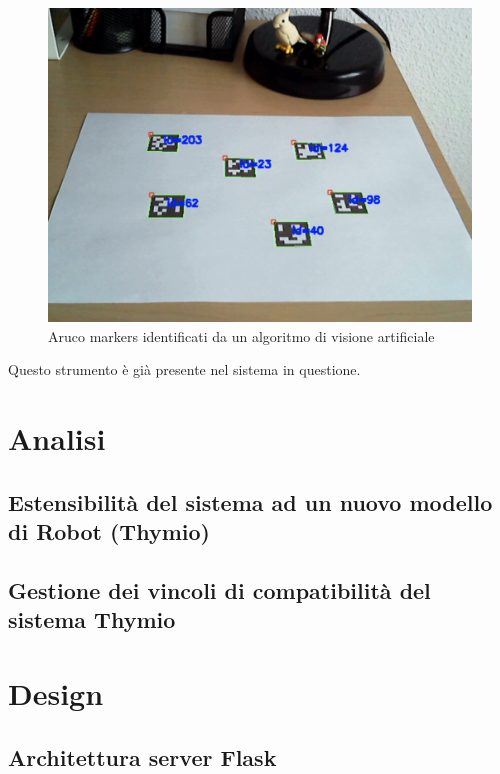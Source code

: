 \documentclass[12pt,a4paper,openright,twoside]{book}
\begin{document}
\begin{figure}
    \centering
    \includegraphics[width=.8\linewidth]{figures/aruco-markers.png}
    \caption{Aruco markers identificati da un algoritmo di visione artificiale}
    \label{fig:aruco-markers}
\end{figure}

Questo strumento è già presente nel sistema in questione.

\chapter{Analisi}
\label{chap:analisi}

\section{Estensibilità del sistema ad un nuovo modello di Robot (Thymio)}

\section{Gestione dei vincoli di compatibilità del sistema Thymio}


\chapter{Design}
\label{chap:design}

\section{Architettura server Flask}
\end{document}
